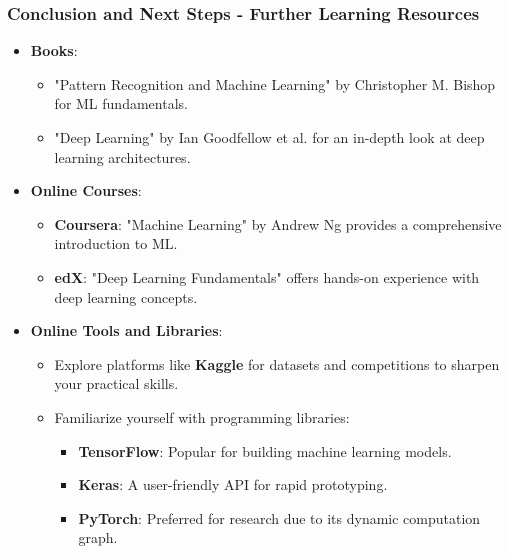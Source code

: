 \documentclass[aspectratio=169]{beamer}
\begin{document}
\begin{frame}[fragile]
    \frametitle{Conclusion and Next Steps - Further Learning Resources}

    \begin{itemize}
        \item \textbf{Books}:
        \begin{itemize}
            \item "Pattern Recognition and Machine Learning" by Christopher M. Bishop for ML fundamentals.
            \item "Deep Learning" by Ian Goodfellow et al. for an in-depth look at deep learning architectures.
        \end{itemize}
        
        \item \textbf{Online Courses}:
        \begin{itemize}
            \item \textbf{Coursera}: "Machine Learning" by Andrew Ng provides a comprehensive introduction to ML.
            \item \textbf{edX}: "Deep Learning Fundamentals" offers hands-on experience with deep learning concepts.
        \end{itemize}
        
        \item \textbf{Online Tools and Libraries}:
        \begin{itemize}
            \item Explore platforms like \textbf{Kaggle} for datasets and competitions to sharpen your practical skills.
            \item Familiarize yourself with programming libraries:
            \begin{itemize}
                \item \textbf{TensorFlow}: Popular for building machine learning models.
                \item \textbf{Keras}: A user-friendly API for rapid prototyping.
                \item \textbf{PyTorch}: Preferred for research due to its dynamic computation graph.
            \end{itemize}
        \end{itemize}
    \end{itemize}    
\end{frame}
\end{document}
